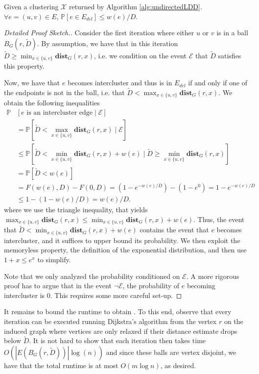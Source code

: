 \begin{claim}
Given a clustering $\mathcal{X}$ returned by Algorithm \ref{alg:undirectedLDD}. $\forall e = (u,v) \in E$, $\mathbb{P}[e \in E_{del}] \leq w(e)/ D$. 
\end{claim}
\begin{proof}[Detailed Proof Sketch.]
Consider the first iteration where either $u$ or $v$ is in a ball $B_G(r, \tilde{D})$. By assumption, we have that in this iteration $\tilde{D} \geq \min_{x \in \{u,v\}} \mathbf{dist}_G(r, x)$, i.e. we condition on the event $\mathcal{E}$ that $\tilde{D}$ satisfies this property. 

Now, we have that $e$ becomes intercluster and thus is in $E_{del}$ if and only if one of the endpoints is not in the ball, i.e. that $\tilde{D} < \max_{x \in \{u,v\}} \mathbf{dist}_G(r, x)$. We obtain the following inequalities 
\begin{align*}
\mathbb{P}&[e \text{ is an intercluster edge} \;|\; \mathcal{E}] \\
    &= \mathbb{P}[\tilde{D} < \max_{x \in \{u,v\}} \mathbf{dist}_G(r, x) \;|\; \mathcal{E}] \\
    &\leq \mathbb{P}[\tilde{D} < \min_{x \in \{u,v\}} \mathbf{dist}_G(r, x) + w(e)  \;|\; \tilde{D} \geq \min_{x \in \{u,v\}} \mathbf{dist}_G(r, x)] \\
    &= \mathbb{P}[\tilde{D} < w(e)] \\
	&= F(w(e), D) - F(0, D) = (1 - e^{-w(e)/D}) - (1 - e^{0}) = 1 - e^{-w(e)/D} \\ &\leq 1 - (1 - w(e)/D) = w(e)/D.
\end{align*}
where we use the triangle inequality, that yields $\max_{x \in \{u,v\}} \mathbf{dist}_G(r, x) \leq \min_{x \in \{u,v\}} \mathbf{dist}_G(r, x) + w(e)$. Thus, the event that $ \tilde{D} < \min_{x \in \{u,v\}} \mathbf{dist}_G(r, x) + w(e)$ contains the event that $e$ becomes intercluster, and it suffices to upper bound its probability. We then exploit the memoryless property, the definition of the exponential distribution, and then use $1+x \leq e^x$ to simplify.

Note that we only analyzed the probability conditioned on $\mathcal{E}$. A more rigorous proof has to argue that in the event $\neg \mathcal{E}$, the probability of $e$ becoming intercluster is $0$. This requires some more careful set-up.
\end{proof}

It remains to bound the runtime to obtain . To this end, observe that every iteration can be executed running Dijkstra's algorithm from the vertex $r$ on the induced graph where vertices are only relaxed if their distance estimate drops below $\tilde{D}$. It is not hard to show that each iteration then takes time $O(|E(B_G(r, \tilde{D}))| \log(n))$ and since these balls are vertex disjoint, we have that the total runtime is at most $O(m\log n)$, as desired.

